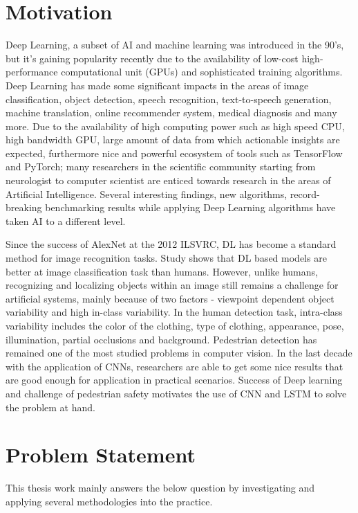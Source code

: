 \section{Motivation}
Deep Learning, a subset of AI and machine learning was introduced in the 90's, but it's gaining popularity recently due to the availability of low-cost high-performance computational unit (GPUs) and sophisticated training algorithms. Deep Learning has made some significant impacts in the areas of image classification, 
object detection, speech recognition, text-to-speech generation, machine translation,
online recommender system, medical diagnosis and many more. Due to the availability of high 
computing power such as high speed CPU, high bandwidth GPU, large amount of 
data from which actionable insights are expected, furthermore nice and powerful ecosystem of  
tools such as TensorFlow and PyTorch; many researchers in the scientific community 
starting from neurologist to computer scientist are enticed towards research in the areas 
of Artificial Intelligence. Several interesting findings, new algorithms, record-breaking benchmarking results while applying Deep Learning algorithms have taken AI to a different level.

\newpara 

\newpara Since the success of AlexNet at the 2012 ILSVRC, DL has become a standard method for image recognition tasks. Study shows that DL based models are better at image classification task than humans. However, unlike humans, recognizing and localizing objects within an image still remains a challenge for artificial 
systems, mainly because of two factors - viewpoint dependent object variability and
high in-class variability. In the human detection task, intra-class variability includes
the color of the clothing, type of clothing, appearance, pose, illumination, partial occlusions
and background. Pedestrian detection has remained one of the most studied problems in computer vision.
In the last decade with the application of CNNs, researchers are able to get some nice results 
that are good enough for application in practical scenarios. Success of Deep learning and challenge of pedestrian safety motivates the use of CNN and LSTM to solve the problem at hand.

\section{Problem Statement }
This thesis work mainly answers the below question by investigating and  applying several methodologies into the practice. 

